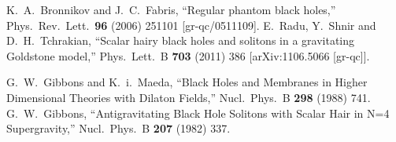 \begin{small}
\begin{thebibliography}{99}
  K.~A.~Bronnikov and J.~C.~Fabris,
  ``Regular phantom black holes,''
  Phys.\ Rev.\ Lett.\  {\bf 96} (2006) 251101
  [gr-qc/0511109].
  E.~Radu, Y.~Shnir and D.~H.~Tchrakian,
  ``Scalar hairy black holes and solitons in a gravitating Goldstone model,''
  Phys.\ Lett.\ B {\bf 703} (2011) 386
  [arXiv:1106.5066 [gr-qc]].
	
  G.~W.~Gibbons and K.~i.~Maeda,
  ``Black Holes and Membranes in Higher Dimensional Theories with Dilaton Fields,''
  Nucl.\ Phys.\ B {\bf 298} (1988) 741.
  G.~W.~Gibbons,
  ``Antigravitating Black Hole Solitons with Scalar Hair in N=4 Supergravity,''
  Nucl.\ Phys.\ B {\bf 207} (1982) 337.


\end{thebibliography}
\end{small}
